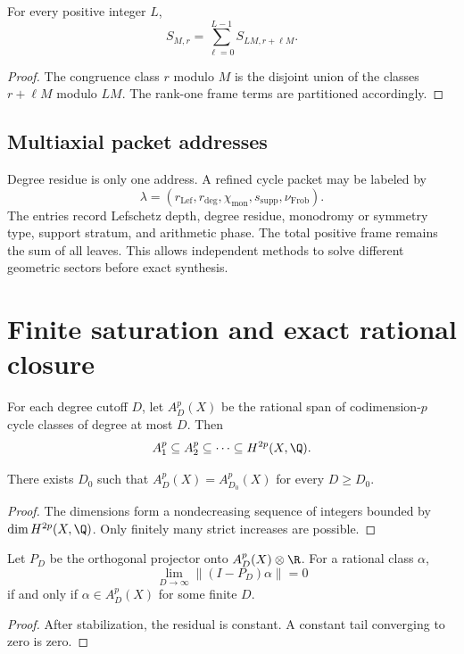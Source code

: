 \begin{theorem}
For every positive integer $L$,
\[
S_{M,r}=\sum_{\ell=0}^{L-1}S_{LM,r+\ell M}.
\]
\end{theorem}
\begin{proof}
The congruence class $r$ modulo $M$ is the disjoint union of the classes $r+\ell M$ modulo $LM$. The rank-one frame terms are partitioned accordingly.
\end{proof}





\section{Multiaxial packet addresses}
Degree residue is only one address. A refined cycle packet may be labeled by
\[
\lambda=(r_{\mathrm{Lef}},r_{\deg},\chi_{\mathrm{mon}},s_{\mathrm{supp}},\nu_{\mathrm{Frob}}).
\]
The entries record Lefschetz depth, degree residue, monodromy or symmetry type, support stratum, and arithmetic phase. The total positive frame remains the sum of all leaves. This allows independent methods to solve different geometric sectors before exact synthesis.

\chapter{Finite saturation and exact rational closure}
For each degree cutoff $D$, let $A_D^p(X)$ be the rational span of codimension-$p$ cycle classes of degree at most $D$. Then
\[
A_1^p\subseteq A_2^p\subseteq\cdots\subseteq H^{2p}(X,\Q).
\]

\begin{theorem}
There exists $D_0$ such that $A_D^p(X)=A_{D_0}^p(X)$ for every $D\ge D_0$.
\end{theorem}
\begin{proof}
The dimensions form a nondecreasing sequence of integers bounded by $\dim H^{2p}(X,\Q)$. Only finitely many strict increases are possible.
\end{proof}

\begin{corollary}
Let $P_D$ be the orthogonal projector onto $A_D^p(X)\otimes\R$. For a rational class $\alpha$,
\[
\lim_{D\to\infty}\|(I-P_D)\alpha\|=0
\]
if and only if $\alpha\in A_D^p(X)$ for some finite $D$.
\end{corollary}
\begin{proof}
After stabilization, the residual is constant. A constant tail converging to zero is zero.
\end{proof}

